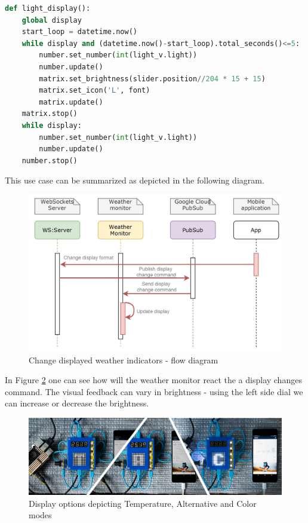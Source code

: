 \begin{lstlisting}[language=Python, caption=IoT Data Sensing Layer: 3 (Light display execution sequence; runs until the thread is canceled), label=aladinfermecat]
def light_display():
    global display
    start_loop = datetime.now()
    while display and (datetime.now()-start_loop).total_seconds()<=5:
        number.set_number(int(light_v.light))
        number.update()
        matrix.set_brightness(slider.position//204 * 15 + 15)
        matrix.set_icon('L', font)
        matrix.update()
    matrix.stop()
    while display:
        number.set_number(int(light_v.light))
        number.update()
    number.stop()
\end{lstlisting}

This use case can be summarized as depicted in the following diagram.

\begin{figure}[!htb]
    \centering
    \includegraphics[width = 14cm]{figures/sub-diagram-2}
    \caption{Change displayed weather indicators - flow diagram}
    \label{fig:usecases}
\end{figure}

In Figure \ref{fig:faces_panel} one can see how will the weather monitor react the a display changes command. The visual feedback can vary in brightness - using the left side dial we can increase or decrease the brightness. 

\begin{figure}[!htb]
    \centering
    \includegraphics[width = 15.5cm]{figures/faces}
    \caption{Display options depicting Temperature, Alternative and Color modes}
    \label{fig:faces_panel}
\end{figure}

